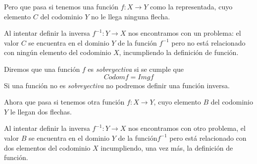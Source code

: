 \documentclass[../Teoría.root.tex]{subfiles}
\begin{document}
Pero que pasa si tenemos una función \(f:X\rightarrow Y\) como la representada, cuyo elemento \(C\) del codominio \(Y\) no le llega ninguna flecha.
\begin{center}
\end{center}
Al intentar definir la inversa \(f^{−1}: Y\rightarrow X\) nos encontramos con un problema:
el valor \(C\) se encuentra en el dominio \(Y\) de la función \(f^{−1}\) pero no está relacionado con ningún elemento del codominio \(X\), incumpliendo la definición de función.

Diremos que una función \(f\) es \textit{sobreyectiva} si se cumple que \[Codom f=Img f\] Si una función no es \textit{sobreyectiva} no podremos definir una función inversa.

Ahora que pasa si tenemos otra función \(f:X\rightarrow Y\), cuyo elemento \(B\) del codominio \(Y\) le llegan dos flechas.
\begin{center}
\end{center}
Al intentar definir la inversa \(f^{−1}: Y\rightarrow X\) nos encontramos con otro problema, el valor \(B\) se encuentra en el dominio \(Y\) de la función\(f^{−1}\) pero está relacionado con dos elementos del codominio \(X\) incumpliendo, una vez más, la definición de función.
\end{document}
